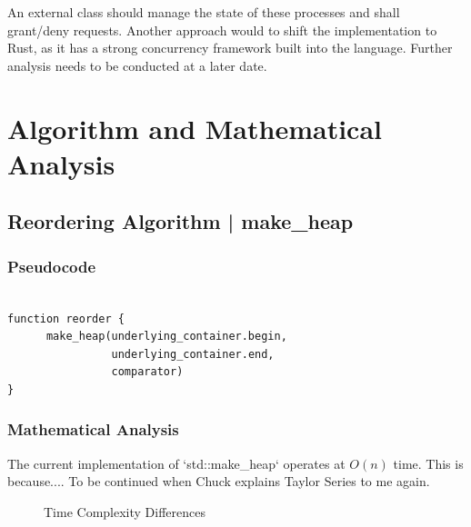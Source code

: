 \documentclass{article}
\begin{document}
\begin{flushleft}
An external class should manage the state of these processes and shall grant/deny requests.
Another approach would to shift the implementation to Rust, as it has a strong concurrency framework built into the language.
Further analysis needs to be conducted at a later date.
\end{flushleft}

\newpage

\section{Algorithm and Mathematical Analysis}

\subsection{Reordering Algorithm | make_heap}

\subsubsection{Pseudocode}

\begin{verbatim}

function reorder {
      make_heap(underlying_container.begin, 
                underlying_container.end,
                comparator)
}
\end{verbatim}

\subsubsection{Mathematical Analysis}

The current implementation of `std::make_heap` operates at $O(n)$ time.
This is because....
To be continued when Chuck explains Taylor Series to me again.
\begin{figure}[!h]
\centering
{}
\caption{Time Complexity Differences}
\end{figure}
\end{document}
